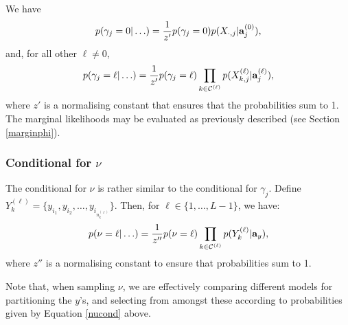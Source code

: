 \documentclass[12pt]{article}
\begin{document}
We have 
\begin{equation}
p(\gamma_j = 0|\ldots) = \frac{1}{z'}p(\gamma_j = 0)p(X_{\cdot,j}|{\bf a}_j^{(0)}),\label{gammacond4b}
\end{equation}
and, for all other $\ell \ne 0$,
\begin{equation}
p(\gamma_j = \ell | \ldots) = \frac{1}{z'} p(\gamma_j = \ell)\prod_{k\in \mathcal{C}^{(\ell)}}  p(X_{k,j}^{(\ell)}|{\bf a}_j^{(\ell)}),\label{gammacond4a}
\end{equation}
where $z'$ is a normalising constant that ensures that the probabilities sum to 1.  The marginal likelihoods may be evaluated as previously described (see Section \ref{marginphi}).  

\subsubsection{Conditional for $\nu$}
The conditional for $\nu$ is rather similar to the conditional for $\gamma_j$.  Define $Y_{k}^{(\ell)} = \{ {y}_{i_1}, {y}_{i_2}, \ldots, {y}_{i_{n_k^{(\ell)}}} \}$.  Then, for $\ell \in \{1, \ldots, L-1\}$, we have:
\begin{equation}
p(\nu = \ell | \ldots) = \frac{1}{z''} p(\nu = \ell)\prod_{k\in \mathcal{C}^{(\ell)}}  p(Y_k^{(\ell)}|{\bf a}_y),\label{nucond}
\end{equation}
where $z''$ is a normalising constant to ensure that probabilities sum to 1.

Note that, when sampling $\nu$, we are effectively comparing different models for partitioning the $y$'s, and selecting from amongst these according to probabilities given by Equation \eqref{nucond} above.  


  


%
%
%
%

%
%
%
%
%
\end{document}
